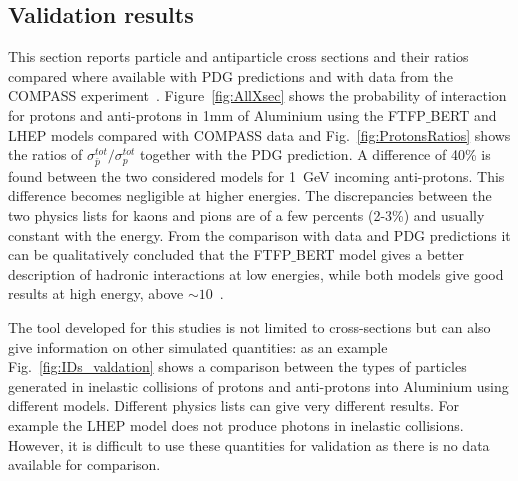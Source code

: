 \subsection{Validation results}

This section reports particle and antiparticle cross sections and their ratios
compared where available with PDG predictions and with data from the COMPASS experiment~\cite{Abbon:2007pq}.
%
Figure~\ref{fig:AllXsec} shows the probability of interaction for protons and anti-protons in 1mm of Aluminium
using the FTFP$\_$BERT and LHEP models compared with COMPASS data
and Fig.~\ref{fig:ProtonsRatios} shows the ratios of $\sigma^{tot}_{\bar{p}} / \sigma^{tot}_{p}$
together with the PDG prediction. 
%
A difference of 40\% is found between the two considered models for 1~GeV incoming anti-protons.
This difference becomes negligible at higher energies. The discrepancies between the two physics lists
for kaons and pions are of a few percents (2-3\%) and usually constant with the energy. From the comparison 
with data and PDG predictions it can be qualitatively concluded that the FTFP$\_$BERT model gives a better
description of hadronic interactions at low energies, while both models give good results at high energy, above $\sim10$~\gev.

The tool developed for this studies is not limited to cross-sections but can also give information on other simulated quantities:
as an example Fig.~\ref{fig:IDs_valdation} shows a comparison between the types of particles generated in inelastic
collisions of protons and anti-protons into Aluminium using different models. Different physics lists can give very different results.
For example the LHEP model does not produce photons in inelastic collisions. However, it is difficult to use these
quantities for validation as there is no data available for comparison.


